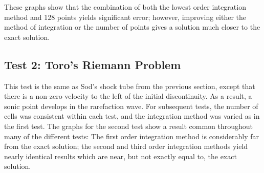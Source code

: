 \documentclass[10pt]{article}
\begin{document}
These graphs show that the combination of both the lowest order integration method and 128 points yields significant error; however, improving either the method of integration or the number of points gives a solution much closer to the exact solution. 

\clearpage

\subsection{Test 2: Toro's Riemann Problem}

This test is the same as Sod's shock tube from the previous section, except that there is a non-zero velocity to the left of the initial discontinuity.  
As a result, a sonic point develops in the rarefaction wave.  
For subsequent tests, the number of cells was consistent within each test, and the integration method was varied as in the first test. 
The graphs for the second test show a result common throughout many of the different tests: The first order integration method is considerably far from the exact solution; the second and third order integration methods yield nearly identical results which are near, but not exactly equal to, the exact solution. 
\end{document}
